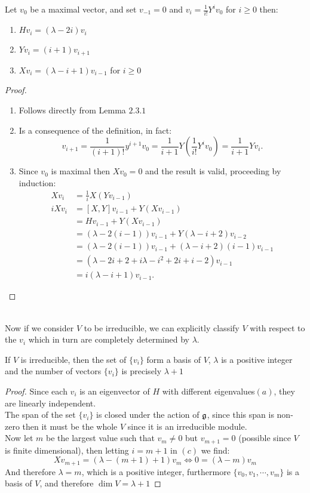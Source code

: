 \begin{lema}
Let $v_0$ be a maximal vector, and set $v_{-1}=0$ and $v_{i}=\frac{1}{i!}Y^iv_0$ for $i\ge 0$ then:
\begin{enumerate}[label=(\alph*)]
	\item $Hv_i = (\lambda - 2i)v_i$
	\item $Yv_i = (i+1)v_{i+1}$
	\item $Xv_i = (\lambda-i+1)v_{i-1}$ for $i\ge0$
\end{enumerate}
\end{lema}
\begin{proof}
	\begin{enumerate}[label=(\alph*)]
		\item Follows directly from Lemma $2.3.1$
		\item Is a consequence of the definition, in fact:
		$$v_{i+1} = \frac{1}{(i+1)!}y^{i+1}v_0 = \frac{1}{i+1} Y\left(\frac{1}{i!}Y^i v_0\right) = \frac{1}{i+1} Yv_i.$$
		\item Since $v_0$ is maximal then $Xv_0=0$ and the result is valid, proceeding by induction:
		\begin{align*}
		Xv_i &= \frac{1}{i}X(Yv_{i-1})\\
		iXv_i&= [X,Y]v_{i-1} + Y(Xv_{i-1})\\
			 &= Hv_{i-1} + Y(Xv_{i-1})\\
			 &= (\lambda-2(i-1))v_{i-1} + Y(\lambda - i + 2)v_{i-2}\\
			 &= (\lambda-2(i-1))v_{i-1} + (\lambda - i + 2)(i-1)v_{i-1}\\
			 &=  (\lambda - 2i + 2 + i\lambda - i^2 + 2i + i - 2)v_{i-1}\\
			 &= i(\lambda-i+1)v_{i-1}.
		\end{align*}
	\end{enumerate}
\end{proof}\\
Now if we consider $V$ to be irreducible, we can explicitly classify $V$ with respect to the $v_i$ which in turn are completely determined by $\lambda$.
\begin{teo}
If $V$ is irreducible, then the set of $\{v_i\}$ form a basis of $V$, $\lambda$ is a positive integer and the number of vectors $\{v_i\}$ is precisely $\lambda+1$
\end{teo}
\begin{proof}
	Since each $v_i$ is an eigenvector of $H$ with different eigenvalues$(a)$, they are linearly independent.\\
	The span of the set $\{v_i\}$ is closed under the action of $\mathfrak{g}$, since this span is non-zero then it must be the whole $V$ since it is an irreducible module.\\
	Now let $m$ be the largest value such that $v_m \not=0$ but $v_{m+1}=0$ (possible since $V$ is finite dimensional), then letting $i=m+1$ in $(c)$ we find:
	$$Xv_{m+1} = (\lambda - (m+1)+1)v_m \iff 0 = (\lambda-m)v_m$$
	And therefore $\lambda=m$, which is a positive integer, furthermore $\{v_0,v_1,\cdots,v_m\}$ is a basis of $V$, and therefore $\dim V = \lambda + 1$
\end{proof}
